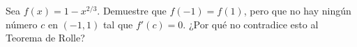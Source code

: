 \item Sea $f(x) = 1 - x^{2/3}$. Demuestre que $f(-1) = f(1)$, pero que no hay ningún número $c$ en $(-1, 1)$ tal que $f'(c) = 0$. ¿Por qué no contradice esto al Teorema de Rolle?
